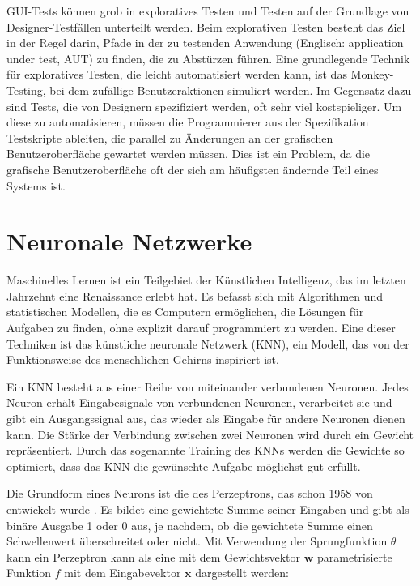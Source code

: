 GUI-Tests können grob in exploratives Testen und Testen auf der Grundlage von Designer-Testfällen unterteilt werden.
Beim explorativen Testen besteht das Ziel in der Regel darin, Pfade in der zu testenden Anwendung (Englisch: application under test, AUT) zu finden, die zu Abstürzen führen.
Eine grundlegende Technik für exploratives Testen, die leicht automatisiert werden kann, ist das Monkey-Testing, bei dem zufällige Benutzeraktionen simuliert werden.
Im Gegensatz dazu sind Tests, die von Designern spezifiziert werden, oft sehr viel kostspieliger.
Um diese zu automatisieren, müssen die Programmierer aus der Spezifikation Testskripte ableiten, die parallel zu Änderungen an der grafischen Benutzeroberfläche gewartet werden müssen.
Dies ist ein Problem, da die grafische Benutzeroberfläche oft der sich am häufigsten ändernde Teil eines Systems ist.

\section{Neuronale Netzwerke}
\label{subsec:Foundations:NeuralNetworks}

Maschinelles Lernen ist ein Teilgebiet der Künstlichen Intelligenz, das im letzten Jahrzehnt eine Renaissance erlebt hat.
Es befasst sich mit Algorithmen und statistischen Modellen, die es Computern ermöglichen, die Lösungen für Aufgaben zu finden, ohne explizit darauf programmiert zu werden.
Eine dieser Techniken ist das künstliche neuronale Netzwerk (KNN), ein Modell, das von der Funktionsweise des menschlichen Gehirns inspiriert ist.

Ein KNN besteht aus einer Reihe von miteinander verbundenen Neuronen.
Jedes Neuron erhält Eingabesignale von verbundenen Neuronen, verarbeitet sie und gibt ein Ausgangssignal aus, das wieder als Eingabe für andere Neuronen dienen kann.
Die Stärke der Verbindung zwischen zwei Neuronen wird durch ein Gewicht repräsentiert.
Durch das sogenannte Training des KNNs werden die Gewichte so optimiert, dass das KNN die gewünschte Aufgabe möglichst gut erfüllt.

Die Grundform eines Neurons ist die des Perzeptrons, das schon 1958 von  entwickelt wurde \cite{Rosenblatt1958}.
Es bildet eine gewichtete Summe seiner Eingaben und gibt als binäre Ausgabe 1 oder 0 aus, je nachdem, ob die gewichtete Summe einen Schwellenwert überschreitet oder nicht.
Mit Verwendung der Sprungfunktion $\theta$ kann ein Perzeptron kann als eine mit dem Gewichtsvektor $\mathbf{w}$ parametrisierte Funktion $f$ mit dem Eingabevektor $\mathbf{x}$ dargestellt werden:

